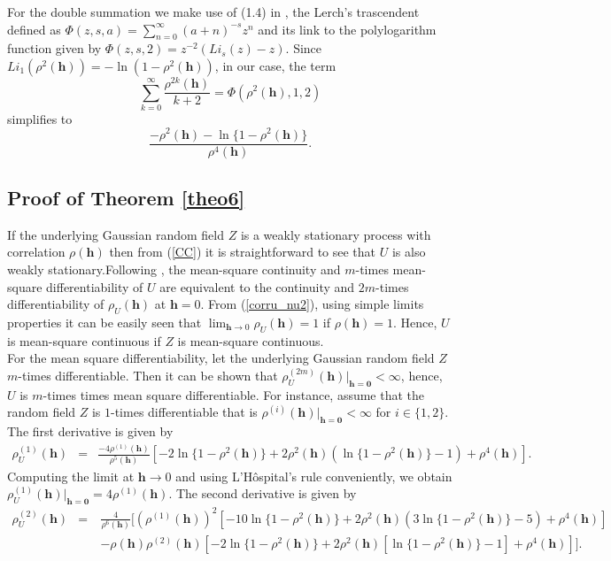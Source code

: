 \documentclass[times,sort&compress,3p]{elsarticle}
\theoremstyle{plain}%
\theoremstyle{definition}
\def\hh{\bm{h}}
\begin{document}
\noindent For the double summation we make use of (1.4) in \cite{choi2003notes}, the Lerch's trascendent defined as
$
\Phi(z,s,a)=\sum_{n=0}^{\infty} (a+n)^{-s} z^n
$
and its link to the polylogarithm function given by
$
\Phi(z,s,2)=z^{-2}(Li_{s}(z)-z).
$ Since
$
Li_1(\rho^2(\hh))=-\ln(1-\rho^2(\hh))
$,
in our case, the term $$\sum\limits_{k=0}^{\infty}\dfrac{\rho^{2k}(\hh)}{k+2}=\Phi(\rho^2(\hh),1,2)$$ simplifies to
$$\dfrac{-\rho^2(\hh)-\ln\{1-\rho^2(\hh)\}}{\rho^4(\hh)}.$$


\subsection*{Proof of Theorem \ref{theo6}}\label{proof_theo6}

\noindent If the underlying Gaussian random field $Z$ is a weakly stationary process with correlation $\rho(\hh)$ then from (\ref{CC}) it is straightforward to see that $U$ is also weakly stationary.Following \cite{Stein:1999}, the mean-square continuity and $m$-times mean-square differentiability of $U$ are equivalent to the continuity and $2m$-times differentiability of $\rho_{U}(\hh)$ at $\hh=0$. From (\ref{corru_nu2}), using simple limits properties it can be easily seen that $\lim_{\hh\rightarrow 0} \rho_{U}(\hh)=1$ if $\rho(\hh)=1$. Hence, $U$ is mean-square continuous if  $Z$ is mean-square continuous.\\
For the mean square differentiability, let the underlying Gaussian random field $Z$ $m$-times differentiable. Then it can be shown that $\rho_{U}^{(2m)}(\hh)\big\vert_{\hh\bm{=0}}<\infty$, hence, $U$ is $m$-times times mean square differentiable. For instance, assume that the random field $Z$ is $1$-times differentiable that is  $\rho^{(i)}(\hh)\big\vert_{\hh\bm{=0}}<\infty$ for $i\in\{1,2\}$. The first derivative is given by
\begin{eqnarray*}
\rho_{U}^{(1)}(\hh)&=&\frac{-4\rho^{(1)}(\hh)}{\rho^5(\hh)}\left[-2\ln\{1-\rho^2(\hh)\}+2\rho^2(\hh)(\ln\{1-\rho^2(\hh)\}-1)+\rho^4(\hh) \right].
\end{eqnarray*}
Computing the limit at $\hh\rightarrow 0$ and using L'H\^{o}spital's rule conveniently, we obtain $\rho_{U}^{(1)}(\hh)\big\vert_{\hh\bm{=0}}=4 \rho^{(1)}(\hh)$. The second derivative is given by
\begin{eqnarray*}
\rho_{U}^{(2)}(\hh)&=&\frac{4}{\rho^6(\hh)}\Bigg[ (\rho^{(1)}(\hh))^2 \left[ -10\ln\{1-\rho^2(\hh)\}+2\rho^2(\hh)(3\ln\{1-\rho^2(\hh)\}-5)+\rho^{4}(\hh)\right]\\
&\quad&- \rho(\hh)\rho^{(2)}(\hh)\left[ -2\ln\{1-\rho^2(\hh)\}+2\rho^2(\hh)\left[\ln\{1-\rho^2(\hh)\}-1\right]+\rho^{4}(\hh)\right]\Bigg].
\end{eqnarray*}
\end{document}
